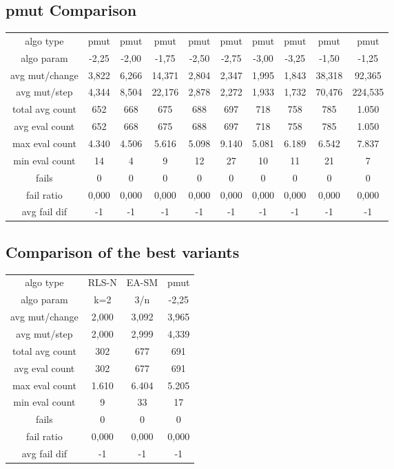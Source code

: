 \subsection{pmut Comparison}

\begin{tabular}[h]{cccccccccc}
algo type&           pmut&    pmut&    pmut&    pmut&    pmut&    pmut&    pmut&    pmut&    pmut\\
algo param&         -2,25&   -2,00&   -1,75&   -2,50&   -2,75&   -3,00&   -3,25&   -1,50&   -1,25\\
avg mut/change&     3,822&   6,266&  14,371&   2,804&   2,347&   1,995&   1,843&  38,318&  92,365\\
avg mut/step&       4,344&   8,504&  22,176&   2,878&   2,272&   1,933&   1,732&  70,476& 224,535\\
\hline
total avg count&      652&     668&     675&     688&     697&     718&     758&     785&   1.050\\
avg eval count&       652&     668&     675&     688&     697&     718&     758&     785&   1.050\\
max eval count&     4.340&   4.506&   5.616&   5.098&   9.140&   5.081&   6.189&   6.542&   7.837\\
min eval count&        14&       4&       9&      12&      27&      10&      11&      21&       7\\
\hline
fails&                  0&       0&       0&       0&       0&       0&       0&       0&       0\\
fail ratio&         0,000&   0,000&   0,000&   0,000&   0,000&   0,000&   0,000&   0,000&   0,000\\
avg fail dif&          -1&      -1&      -1&      -1&      -1&      -1&      -1&      -1&      -1\\
\end{tabular}

\subsection{Comparison of the best variants}

\begin{tabular}[h]{cccc}
algo type&        RLS-N& EA-SM&  pmut\\
algo param&         k=2&   3/n& -2,25\\
avg mut/change&   2,000& 3,092& 3,965\\
avg mut/step&     2,000& 2,999& 4,339\\
\hline
total avg count&    302&   677&   691\\
avg eval count&     302&   677&   691\\
max eval count&   1.610& 6.404& 5.205\\
min eval count&       9&    33&    17\\
\hline
fails&                0&     0&     0\\
fail ratio&       0,000& 0,000& 0,000\\
avg fail dif&        -1&    -1&    -1\\
\end{tabular}

